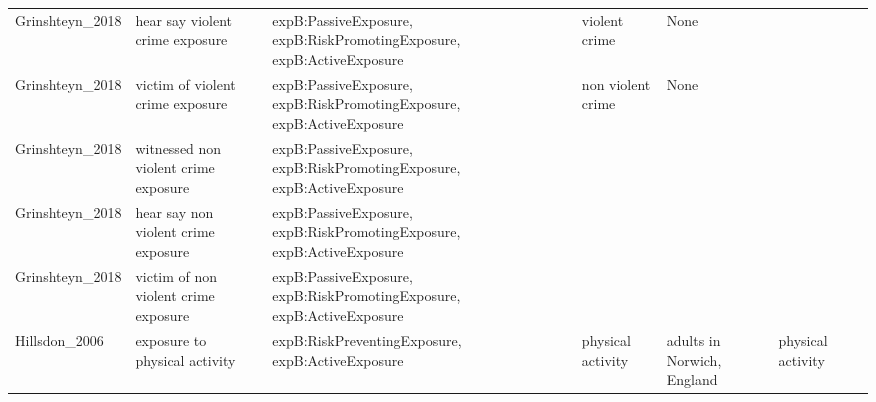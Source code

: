 \begin{tabular}{p{1cm}p{1cm}p{1cm}p{1cm}p{1cm}p{1cm}p{1cm}}
Grinshteyn\_2018 & hear say violent crime exposure & expB:PassiveExposure, expB:RiskPromotingExposure, expB:ActiveExposure & violent crime & None &  &  \\
Grinshteyn\_2018 & victim of violent crime exposure & expB:PassiveExposure, expB:RiskPromotingExposure, expB:ActiveExposure & non violent crime & None &  &  \\
Grinshteyn\_2018 & witnessed non violent crime exposure & expB:PassiveExposure, expB:RiskPromotingExposure, expB:ActiveExposure &  &  &  &  \\
Grinshteyn\_2018 & hear say non violent crime exposure & expB:PassiveExposure, expB:RiskPromotingExposure, expB:ActiveExposure &  &  &  &  \\
Grinshteyn\_2018 & victim of non violent crime exposure & expB:PassiveExposure, expB:RiskPromotingExposure, expB:ActiveExposure &  &  &  &  \\
Hillsdon\_2006 & exposure to physical activity & expB:RiskPreventingExposure, expB:ActiveExposure & physical activity & adults in Norwich, England & physical activity &  \\
\bottomrule
\end{tabular}
